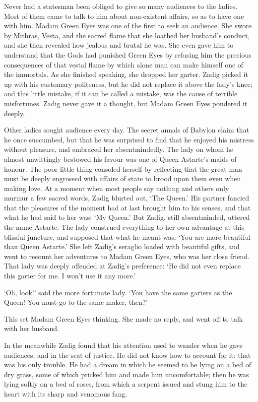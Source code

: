 \documentclass{article}
\begin{document}
\begin{center}
Never had a statesman been obliged to give so many audiences to the ladies. Most 
of them came to talk to him about non-existent affairs, so as to have one with 
him. Madam Green Eyes was one of the first to seek an audience. She swore by Mithras, 
Vesta, and the sacred flame that she loathed her husband's conduct, and she then 
revealed how jealous and brutal he was. She even gave him to understand that the 
Gods had punished Green Eyes by refusing him the precious consequences of that 
vestal flame by which alone man can make himself one of the immortals. As she finished 
speaking, she dropped her garter. Zadig picked it up with his customary politeness, 
but he did not replace it above the lady's knee; and this little mistake, if it 
can be called a mistake, was the cause of terrible misfortunes. Zadig never gave 
it a thought, but Madam Green Eyes pondered it deeply. 

Other ladies sought audience every day. The secret annals of Babylon claim that 
he once succumbed, but that he was surprised to find that he enjoyed his mistress 
without pleasure, and embraced her absentmindedly. The lady on whom he almost unwittingly 
bestowed his favour was one of Queen Astarte's maids of honour. The poor little 
thing consoled herself by reflecting that the great man must be deeply engrossed 
with affairs of state to brood upon them even when making love. At a moment when 
most people say nothing and others only murmur a few sacred words, Zadig blurted 
out, `The Queen.' His partner fancied that the pleasures of the moment had at last 
brought him to his senses, and that what he had said to her was: `My Queen.' But 
Zadig, still absentminded, uttered the name Astarte. The lady construed everything 
to her own advantage at this blissful juncture, and supposed that what he meant 
was: `You are more beautiful than Queen Astarte.' She left Zadig's seraglio loaded 
with beautiful gifts, and went to recount her adventures to Madam Green Eyes, who 
was her close friend. That lady was deeply offended at Zadig's preference: `He 
did not even replace this garter for me. I won't use it any more.' 

`Oh, look!' said the more fortunate lady. `You have the same garters as the Queen! 
You must go to the same maker, then?' 

This set Madam Green Eyes thinking. She made no reply, and went off to talk with 
her husband. 

In the meanwhile Zadig found that his attention used to wander when he gave audiences, 
and in the seat of justice. He did not know how to account for it; that was his 
only trouble. He had a dream in which he seemed to be lying on a bed of dry grass, 
some of which pricked him and made him uncomfortable; then he was lying softly 
on a bed of roses, from which a serpent issued and stung him to the heart with 
its sharp and venomous fang. 


\end{center}
\end{document}
